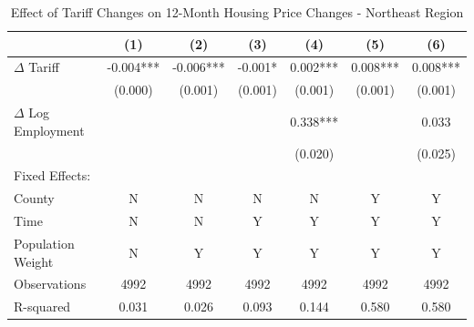 \begin{table}[htbp]
\centering
\caption{Effect of Tariff Changes on 12-Month Housing Price Changes - Northeast Region}
\label{tab:tariffs_changes_northeast}
\begin{tabular}{lcccccc}
\toprule
{} &       (1) &      (2) &       (3) &       (4) &       (5) &        (6) \\
\midrule
$\Delta$ Tariff  &   -0.004*** &    -0.006*** &    -0.001* &    0.002*** &    0.008*** &    0.008*** \\
                 &    (0.000) &   (0.001) &   (0.001) &   (0.001) &   (0.001) &   (0.001) \\
$\Delta$ Log Employment  &           &           &           &  0.338*** &           &  0.033 \\
                  &           &           &           &   (0.020) &           &   (0.025) \\
Fixed Effects:    &           &           &           &           &           &           \\
County           &         N &        N &        N &        N &        Y &        Y \\
Time             &        N &         N &         Y &         Y &         Y &         Y \\
Population Weight &        N &         Y &         Y &         Y &         Y &         Y \\
\midrule
Observations     &     4992 &     4992 &     4992 &     4992 &     4992 &     4992 \\
R-squared        &     0.031 &     0.026 &     0.093 &     0.144 &     0.580 &     0.580 \\
\bottomrule
\end{tabular}
\end{table}
\FloatBarrier